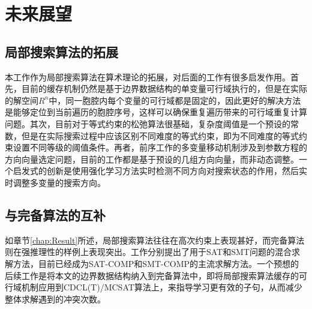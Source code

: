 \section{未来展望}
\subsection{局部搜索算法的拓展}
本工作作为局部搜索算法在算术理论的拓展，对后面的工作有很多启发作用。首先，目前的缓存机制仍然是基于边界数据结构的单变量可行域执行的，但是在实际的解空间$R^n$中，同一胞腔内每个变量的可行域都是固定的，因此更好的解决方法是能够定位到当前遍历的胞腔序号，这样可以确保重复遍历带来的可行域重复计算问题。其次，目前对于等式约束的松弛算法很基础，复杂度阈值是一个预设的常数，但是在实际搜索过程中应该区别不同难度的等式约束，即为不同难度的等式约束设置不同等级的阈值条件。再者，前序工作的多变量移动机制涉及到参数方程的方向向量选定问题，目前的工作都是基于预设的几组方向向量，而非动态调整。一个启发式的创新是使用强化学习方法实时检测不同方向对搜索状态的作用，然后实时调整多变量的搜索方向。

\subsection{与完备算法的互补}
如章节\ref{chap:Result}所述，局部搜索算法往往在高次约束上表现甚好，而完备算法则在强推理性的样例上表现突出。工作\cite{CaiZ21,hybridSMT,BoostMcsat}分别提出了用于SAT和SMT问题的混合求解方法，目前已经成为SAT-COMP和SMT-COMP的主流求解方法。一个预想的后续工作是将本文的边界数据结构纳入到完备算法中，即将局部搜索算法缓存的可行域机制应用到CDCL(T)/MCSAT算法上，来指导学习更有效的子句，从而减少整体求解遇到的冲突次数。